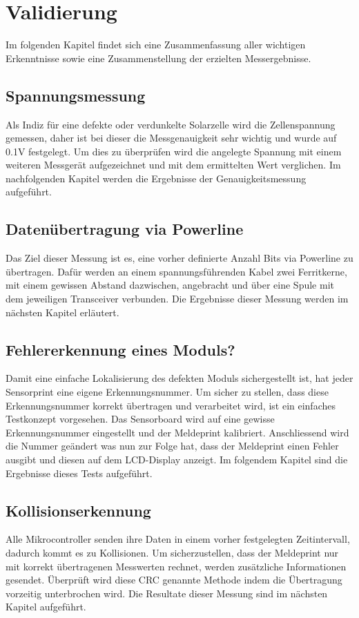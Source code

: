 \section{Validierung}
Im folgenden Kapitel findet sich eine Zusammenfassung aller wichtigen Erkenntnisse sowie eine Zusammenstellung der erzielten Messergebnisse. 
\subsection{Spannungsmessung}
Als Indiz für eine defekte oder verdunkelte Solarzelle wird die Zellenspannung gemessen, daher ist bei dieser die Messgenauigkeit sehr wichtig und wurde auf 0.1V festgelegt. Um dies zu überprüfen wird die angelegte Spannung mit einem weiteren Messgerät aufgezeichnet und mit dem ermittelten Wert verglichen. Im nachfolgenden Kapitel werden die Ergebnisse der Genauigkeitsmessung aufgeführt.
\subsection{Datenübertragung via Powerline}
Das Ziel dieser Messung ist es, eine vorher definierte Anzahl Bits via Powerline zu übertragen. Dafür werden an einem spannungsführenden Kabel zwei Ferritkerne, mit einem gewissen Abstand dazwischen, angebracht und über eine Spule mit dem jeweiligen Transceiver verbunden. Die Ergebnisse dieser Messung werden im nächsten Kapitel erläutert.
\subsection{Fehlererkennung eines Moduls?}
Damit eine einfache Lokalisierung des defekten Moduls sichergestellt ist, hat jeder Sensorprint eine eigene Erkennungsnummer. Um sicher zu stellen, dass diese Erkennungsnummer korrekt übertragen und verarbeitet wird, ist ein einfaches Testkonzept vorgesehen. Das Sensorboard wird auf eine gewisse Erkennungsnummer eingestellt und der Meldeprint kalibriert. Anschliessend wird die Nummer geändert was nun zur Folge hat, dass der Meldeprint einen Fehler ausgibt und diesen auf dem LCD-Display anzeigt. Im folgendem Kapitel sind die Ergebnisse dieses Tests aufgeführt.
\subsection{Kollisionserkennung}
Alle Mikrocontroller senden ihre Daten in einem vorher festgelegten Zeitintervall, dadurch kommt es zu Kollisionen. Um sicherzustellen, dass der Meldeprint nur mit korrekt übertragenen Messwerten rechnet, werden zusätzliche Informationen gesendet. Überprüft wird diese CRC genannte Methode indem die Übertragung vorzeitig unterbrochen wird. Die Resultate dieser Messung sind im nächsten Kapitel aufgeführt.